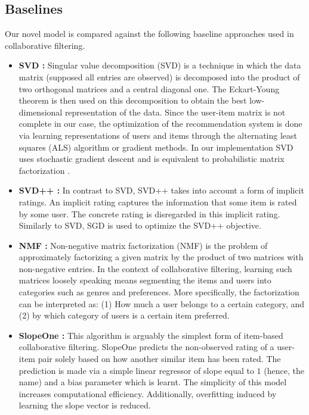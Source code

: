 \subsection{Baselines} \label{baselines}
Our novel model is compared against the following baseline approaches used in collaborative filtering.
\begin{itemize}[leftmargin=0cm]
    \setlength\itemsep{0.6em}
    \item[]
    \textbf{SVD \citep{klema1980singular}:} Singular value decomposition (SVD) is a technique in which the data matrix (supposed all entries are observed) is decomposed into the product of two orthogonal matrices and a central diagonal one. The Eckart-Young theorem \cite{eckart1936approximation} is then used on this decomposition to obtain the best low-dimensional representation of the data. Since the user-item matrix is not complete in our case, the optimization of the recommendation system is done via learning representations of users and items through the alternating least squares (ALS) algorithm or gradient methods. In our implementation SVD uses stochastic gradient descent and is equivalent to probabilistic matrix factorization \citep{sala2007}.
    
    \item[]
    \textbf{SVD++ \citep{koren2008factorization}:} In contrast to SVD, SVD++ takes into account a form of implicit ratings. An implicit rating captures the information that some item is rated by some user. The concrete rating is disregarded in this implicit rating. Similarly to SVD, SGD is used to optimize the SVD++ objective.
    
    \item[]
    \textbf{NMF \citep{zhang2006learning, luo2014efficient}:} Non-negative matrix factorization (NMF) is the problem of approximately factorizing a given matrix by the product of two matrices with non-negative entries. In the context of collaborative filtering, learning such matrices loosely speaking means segmenting the items and users into categories such as genres and preferences. More specifically, the factorization can be interpreted as: (1) How much a user belongs to a certain category, and (2) by which category of users is a certain item preferred.
    
    \item[]\label{sec:slopeone}
    \textbf{SlopeOne \citep{lemire2005slope}:} This algorithm is arguably the simplest form of item-based collaborative filtering. SlopeOne predicts the non-observed rating of a user-item pair solely based on how another similar item has been rated. The prediction is made via a simple linear regressor of slope equal to $1$ (hence, the name) and a bias parameter which is learnt. The simplicity of this model increases computational efficiency. Additionally, overfitting induced by learning the slope vector is reduced.
    

\end{itemize}
